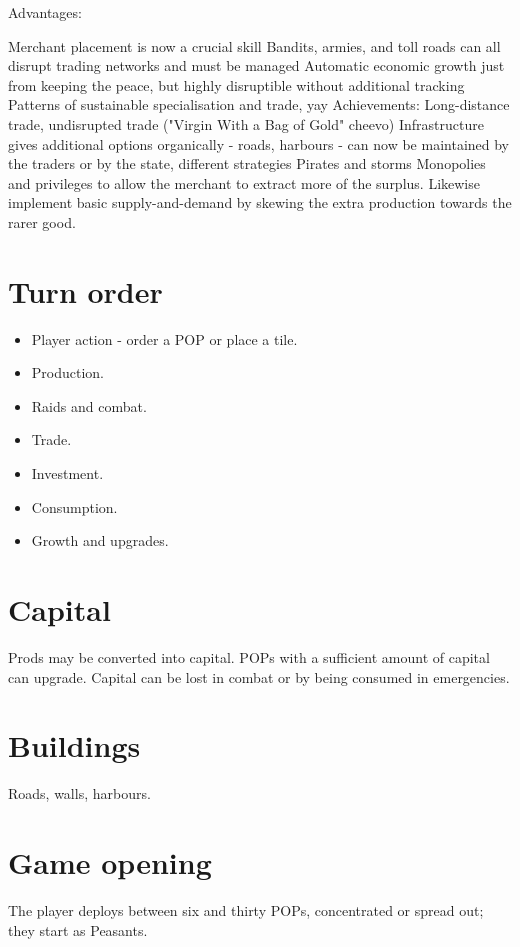 \documentclass[12pt]{article}
\begin{document}
Advantages:

Merchant placement is now a crucial skill
Bandits, armies, and toll roads can all disrupt trading networks and must be managed
Automatic economic growth just from keeping the peace, but highly disruptible without additional tracking
Patterns of sustainable specialisation and trade, yay
Achievements: Long-distance trade, undisrupted trade ("Virgin With a Bag of Gold" cheevo)
Infrastructure gives additional options organically - roads, harbours - can now be maintained by the traders or by the state, different strategies
Pirates and storms
Monopolies and privileges to allow the merchant to extract more of the surplus.
Likewise implement basic supply-and-demand by skewing the extra
production towards the rarer good.

\section{Turn order}

\begin{itemize}
\item Player action - order a POP or place a tile.
\item Production.
\item Raids and combat.
\item Trade.
\item Investment.
\item Consumption.
\item Growth and upgrades.
\end{itemize}

\section{Capital}

Prods may be converted into capital. POPs with a sufficient amount of
capital can upgrade. Capital can be lost in combat or by being
consumed in emergencies.

\section{Buildings}

Roads, walls, harbours.

\section{Game opening}

The player deploys between six and thirty POPs, concentrated or spread
out; they start as Peasants.
\end{document}
